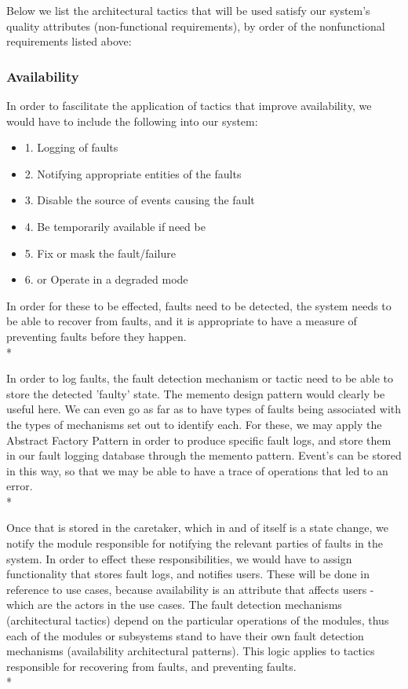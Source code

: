 \documentclass[11pt]{article}
\begin{document}
Below we list the architectural tactics that will be used satisfy our system's quality attributes (non-functional requirements), by order of the nonfunctional requirements listed above:

\subsubsection{Availability}
In order to fascilitate the application of tactics that improve availability, we would have to include the following into our system:
\begin{itemize}
	\item[] 1. Logging of faults
	\item[] 2. Notifying appropriate entities of the faults
	\item[] 3. Disable the source of events causing the fault
	\item[] 4. Be temporarily available if need be
	\item[] 5. Fix or mask the fault/failure
	\item[] 6. or Operate in a degraded mode
\end{itemize}

In order for these to be effected, faults need to be detected, the system needs to be able to recover from faults, and it is appropriate to have a measure of preventing faults before they happen.\\*

In order to log faults, the fault detection mechanism or tactic need to be able to store the detected 'faulty' state. The memento design pattern would clearly be useful here. We can even go as far as to have types of faults being associated with the types of mechanisms set out to identify each. For these, we may apply the Abstract Factory Pattern in order to produce specific fault logs, and store them in our fault logging database through the memento pattern. Event's can be stored in this way, so that we may be able to have a trace of operations that led to an error.\\*

Once that is stored in the caretaker, which in and of itself is a state change, we notify the module responsible for notifying the relevant parties of faults in the system. In order to effect these responsibilities, we would have to assign functionality that stores fault logs, and notifies users. These will be done in reference to use cases, because availability is an attribute that affects users - which are the actors in the use cases. The fault detection mechanisms (architectural tactics) depend on the particular operations of the modules, thus each of the modules or subsystems stand to have their own fault detection mechanisms (availability architectural patterns). This logic applies to tactics responsible for recovering from faults, and preventing faults.\\*
\end{document}
